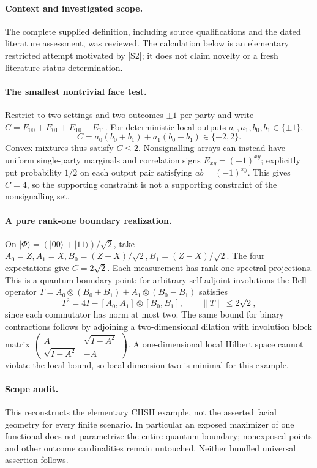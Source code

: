 \documentclass[11pt]{article}
\begin{document}
\paragraph{Context and investigated scope.} The complete supplied definition, including source qualifications and the dated literature assessment, was reviewed. The calculation below is an elementary restricted attempt motivated by [S2]; it does not claim novelty or a fresh literature-status determination.

\paragraph{The smallest nontrivial face test.} Restrict to two settings and two outcomes $\pm1$ per party and write $C=E_{00}+E_{01}+E_{10}-E_{11}$. For deterministic local outputs $a_0,a_1,b_0,b_1\in\{\pm1\}$,
\[
 C=a_0(b_0+b_1)+a_1(b_0-b_1)\in\{-2,2\}.
\]
Convex mixtures thus satisfy $C\leq2$. Nonsignalling arrays can instead have uniform single-party marginals and correlation signs $E_{xy}=(-1)^{xy}$; explicitly put probability $1/2$ on each output pair satisfying $ab=(-1)^{xy}$. This gives $C=4$, so the supporting constraint is not a supporting constraint of the nonsignalling set.

\paragraph{A pure rank-one boundary realization.} On $|\Phi\rangle=(|00\rangle+|11\rangle)/\sqrt2$, take $A_0=Z,A_1=X,B_0=(Z+X)/\sqrt2,B_1=(Z-X)/\sqrt2$. The four expectations give $C=2\sqrt2$. Each measurement has rank-one spectral projections. This is a quantum boundary point: for arbitrary self-adjoint involutions the Bell operator $T=A_0\otimes(B_0+B_1)+A_1\otimes(B_0-B_1)$ satisfies
\[
 T^2=4I-[A_0,A_1]\otimes[B_0,B_1],\qquad \|T\|\leq2\sqrt2,
\]
since each commutator has norm at most two. The same bound for binary contractions follows by adjoining a two-dimensional dilation with involution block matrix $\left(\begin{smallmatrix}A&\sqrt{I-A^2}\\\sqrt{I-A^2}&-A\end{smallmatrix}\right)$. A one-dimensional local Hilbert space cannot violate the local bound, so local dimension two is minimal for this example.

\paragraph{Scope audit.} This reconstructs the elementary CHSH example, not the asserted facial geometry for every finite scenario. In particular an exposed maximizer of one functional does not parametrize the entire quantum boundary; nonexposed points and other outcome cardinalities remain untouched. Neither bundled universal assertion follows.
\end{document}
